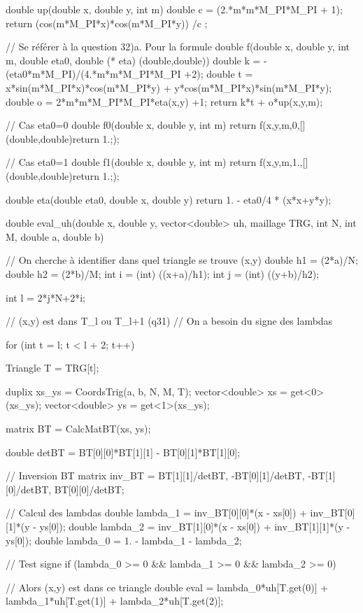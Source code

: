 \begin{codeblock}
{}


double up(double x, double y, int m){
    double c = (2.*m*m*M_PI*M_PI + 1);
    return (cos(m*M_PI*x)*cos(m*M_PI*y)) /c ;
}

// Se référer à la question 32)a. Pour la formule
double f(double x, double y, int m, double eta0, double (* eta) (double,double)){
    double k = -(eta0*m*M_PI)/(4.*m*m*M_PI*M_PI +2);
    double t = x*sin(m*M_PI*x)*cos(m*M_PI*y) + y*cos(m*M_PI*x)*sin(m*M_PI*y);
    double o = 2*m*m*M_PI*M_PI*eta(x,y) +1;
    return k*t + o*up(x,y,m);
}

// Cas eta0=0
double f0(double x, double y, int m){
    return f(x,y,m,0,[](double,double){return 1.;});
}

// Cas eta0=1
double f1(double x, double y, int m){
    return f(x,y,m,1.,[](double,double){return 1.;});
}

double eta(double eta0, double x, double y){
    return 1. - eta0/4 * (x*x+y*y);
}

double eval_uh(double x, double y, vector<double> uh, maillage TRG, int N, int M, double a, double b){
    // On cherche à identifier dans quel triangle se trouve (x,y)
    double h1 = (2*a)/N;
    double h2 = (2*b)/M;
    int i = (int) ((x+a)/h1);
    int j = (int) ((y+b)/h2);

    int l = 2*j*N+2*i;

    // (x,y) est dans T_l ou T_{l+1} (q31)
    // On a besoin du signe des lambdas

    for (int t = l; t < l + 2; t++){
        Triangle T = TRG[t];

        duplix xs_ys = CoordsTrig(a, b, N, M, T);
        vector<double> xs = get<0>(xs_ys);
        vector<double> ys = get<1>(xs_ys);

        matrix BT = CalcMatBT(xs, ys);

        double detBT = BT[0][0]*BT[1][1] - BT[0][1]*BT[1][0];

        // Inversion BT
        matrix inv_BT = {{BT[1][1]/detBT, -BT[0][1]/detBT},
                        {-BT[1][0]/detBT, BT[0][0]/detBT}};

        // Calcul des lambdas
        double lambda_1 = inv_BT[0][0]*(x - xs[0]) + inv_BT[0][1]*(y - ys[0]);
        double lambda_2 = inv_BT[1][0]*(x - xs[0]) + inv_BT[1][1]*(y - ys[0]);
        double lambda_0 = 1. - lambda_1 - lambda_2;

        // Test signe
        if (lambda_0 >= 0 && lambda_1 >= 0 && lambda_2 >= 0){

            // Alors (x,y) est dans ce triangle
            double eval = lambda_0*uh[T.get(0)] + lambda_1*uh[T.get(1)] + lambda_2*uh[T.get(2)];

}}}
\end{codeblock}
